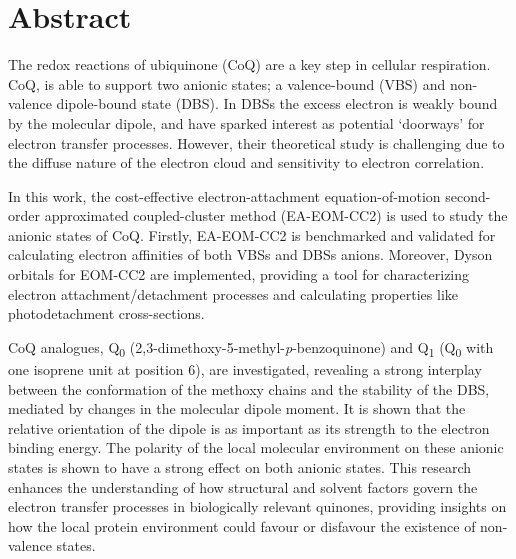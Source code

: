 \chapter*{Abstract}                                 \label{ch:abstract}


The redox reactions of ubiquinone (CoQ) are a key step in cellular respiration. CoQ, is able to support two anionic states; a valence-bound (VBS) and non-valence dipole-bound state (DBS). In DBSs the excess electron is weakly bound by the molecular dipole, and have sparked interest as potential `doorways' for electron transfer processes. However, their theoretical study is challenging due to the diffuse nature of the electron cloud and sensitivity to electron correlation.

In this work, the cost-effective electron-attachment equation-of-motion second-order approximated coupled-cluster method (EA-EOM-CC2) is used to study the anionic states of CoQ. Firstly, EA-EOM-CC2 is benchmarked and validated for calculating electron affinities of both VBSs and DBSs anions. Moreover, Dyson orbitals for EOM-CC2 are implemented, providing a tool for characterizing electron attachment/detachment processes and calculating properties like photodetachment cross-sections.

CoQ analogues, Q\textsubscript{0} (2,3-dimethoxy-5-methyl-\textit{p}-benzoquinone) and Q\textsubscript{1} (Q\textsubscript{0} with one isoprene unit at position 6), are investigated, revealing a strong interplay between the conformation of the methoxy chains and the stability of the DBS, mediated by changes in the molecular dipole moment. It is shown that the relative orientation of the dipole is as important as its strength to the electron binding energy. The polarity of the local molecular environment on these anionic states is shown to have a strong effect on both anionic states. This research enhances the understanding of how structural and solvent factors govern the electron transfer processes in biologically relevant quinones, providing insights on how the local protein environment could favour or disfavour the existence of non-valence states.

\cleardoublepage

